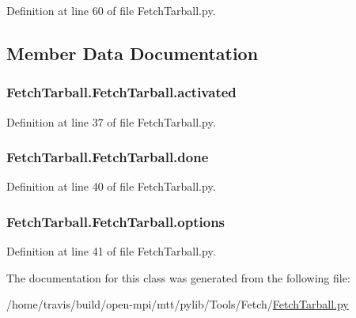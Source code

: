 Definition at line 60 of file Fetch\-Tarball.\-py.



\subsection{Member Data Documentation}
\hypertarget{class_fetch_tarball_1_1_fetch_tarball_a4e6818fd64191913c3f302485c2c4e96}{
\subsubsection[{activated}]{\setlength{\rightskip}{0pt plus 5cm}Fetch\-Tarball.\-Fetch\-Tarball.\-activated}}\label{class_fetch_tarball_1_1_fetch_tarball_a4e6818fd64191913c3f302485c2c4e96}


Definition at line 37 of file Fetch\-Tarball.\-py.

\hypertarget{class_fetch_tarball_1_1_fetch_tarball_ae733fd553804854c3beef59df1739732}{
\subsubsection[{done}]{\setlength{\rightskip}{0pt plus 5cm}Fetch\-Tarball.\-Fetch\-Tarball.\-done}}\label{class_fetch_tarball_1_1_fetch_tarball_ae733fd553804854c3beef59df1739732}


Definition at line 40 of file Fetch\-Tarball.\-py.

\hypertarget{class_fetch_tarball_1_1_fetch_tarball_ae5c7611a1ef415c3e38c75ea803ef2e3}{
\subsubsection[{options}]{\setlength{\rightskip}{0pt plus 5cm}Fetch\-Tarball.\-Fetch\-Tarball.\-options}}\label{class_fetch_tarball_1_1_fetch_tarball_ae5c7611a1ef415c3e38c75ea803ef2e3}


Definition at line 41 of file Fetch\-Tarball.\-py.



The documentation for this class was generated from the following file\-:\begin{DoxyCompactItemize}
\item 
/home/travis/build/open-\/mpi/mtt/pylib/\-Tools/\-Fetch/\hyperlink{_fetch_tarball_8py}{Fetch\-Tarball.\-py}\end{DoxyCompactItemize}
